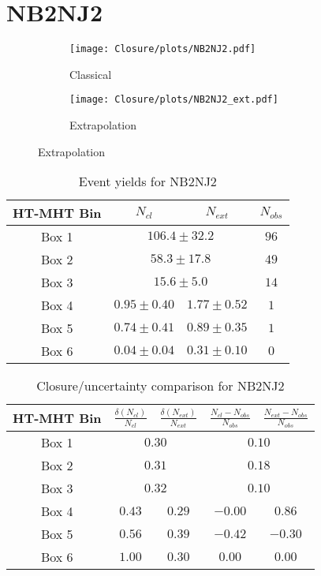 \documentclass[11pt, oneside]{article}
\begin{document}
\clearpage


\section{NB2NJ2}

\begin{figure}[h]
\centering
\caption{NB2NJ2}
\begin{subfigure}[b]{0.49\textwidth}
\texttt{[image: Closure/plots/NB2NJ2.pdf]}
\caption{Classical}
\end{subfigure}
\begin{subfigure}[b]{0.49\textwidth}
\texttt{[image: Closure/plots/NB2NJ2\_ext.pdf]}
\caption{Extrapolation}
\end{subfigure}
\end{figure}


\begin{table}[h]
\centering
\caption{Event yields for NB2NJ2}
\begin{tabular}{|c|c|c|c|}
\hline
HT-MHT Bin & $N_{cl}$ & $N_{ext}$ & $N_{obs}$ \\
\hline
Box 1 & \multicolumn{2}{c|}{$106.4\pm32.2$} & $ 96$ \\ 
Box 2 & \multicolumn{2}{c|}{$58.3\pm17.8$} & $ 49$ \\ 
Box 3 & \multicolumn{2}{c|}{$15.6\pm5.0$} & $ 14$ \\ 
\hline 
Box 4 & $0.95\pm0.40$ & $1.77\pm0.52$ & $  1$ \\ 
Box 5 & $0.74\pm0.41$ & $0.89\pm0.35$ & $  1$ \\ 
Box 6 & $0.04\pm0.04$ & $0.31\pm0.10$ & $  0$ \\ 
\hline
\end{tabular}
\end{table}


\begin{table}[h]
\centering
\caption{Closure/uncertainty comparison for NB2NJ2}
\begin{tabular}{|c|c|c|c|c|}
\hline
HT-MHT Bin & $\frac{\delta(N_{cl})}{N_{cl}}$ & $\frac{\delta(N_{ext})}{N_{ext}}$ & $\frac{N_{cl}-N_{obs}}{N_{obs}}$ &  $\frac{N_{ext}-N_{obs}}{N_{obs}}$ \\
\hline
Box 1 & \multicolumn{2}{c|}{$0.30$} & \multicolumn{2}{c|}{$0.10$} \\ 
Box 2 & \multicolumn{2}{c|}{$0.31$} & \multicolumn{2}{c|}{$0.18$} \\ 
Box 3 & \multicolumn{2}{c|}{$0.32$} & \multicolumn{2}{c|}{$0.10$} \\ 
\hline 
Box 4 & $0.43$ & $0.29$ & $-0.00$ & $0.86$ \\ 
Box 5 & $0.56$ & $0.39$ & $-0.42$ & $-0.30$ \\ 
Box 6 & $1.00$ & $0.30$ & $0.00$ & $0.00$ \\ 
\hline
\end{tabular}
\end{table}
\end{document}

